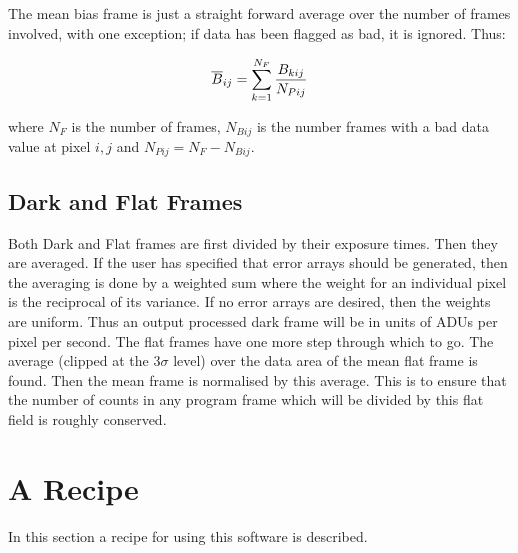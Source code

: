 The mean bias frame is just a straight forward average over the number of
frames involved, with one exception; if data has been flagged as bad, it is
ignored. Thus:

\begin{displaymath}
\overline{B}_{ij} = \sum_{k=1}^{N_F} {B_{kij} \over N_{Pij}}
\end{displaymath}

where $N_F$ is the number of frames, $N_{Bij}$ is the number frames with a bad
data value at pixel $i,j$ and $N_{Pij} = N_F - N_{Bij}$.

\subsection{Dark and Flat Frames}

Both Dark and Flat frames are first divided by their exposure times.  Then they
are averaged.  If the user has specified that error arrays should be generated,
then the averaging is done by a weighted sum where the weight for an individual
pixel is the reciprocal of its variance.  If no error arrays are desired, then
the weights are uniform.  Thus an output processed dark frame will be in units
of ADUs per pixel per second.  The flat frames have one more step through which
to go.  The average (clipped at the $3\sigma$ level) over the data area of the
mean flat frame is found.  Then the mean frame is normalised by this average.
This is to ensure that the number of counts in any program frame which will be
divided by this flat field is roughly conserved.

\section{A Recipe}

In this section a recipe for using this software is described.

